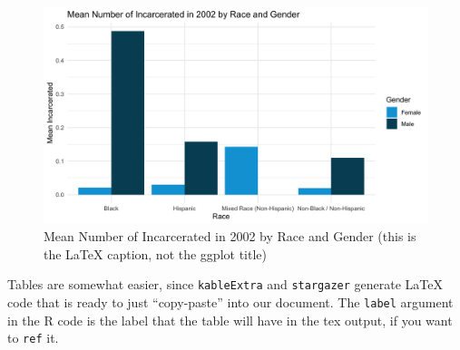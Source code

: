\documentclass{article}
\begin{document}
\begin{figure}[H]
    \begin{center}
        \includegraphics[width=.85\textwidth]{incarceration_by_racegender}
    \end{center}
    \caption{Mean Number of Incarcerated in 2002 by Race and Gender (this is the LaTeX caption, not the ggplot title)}
    \label{fig:graph}
\end{figure}


Tables are somewhat easier, since \texttt{kableExtra} and \texttt{stargazer} generate LaTeX code that is ready to just ``copy-paste'' into our document. The \texttt{label} argument in the R code is the label that the table will have in the tex output, if you want to \texttt{ref} it.




\end{document}
